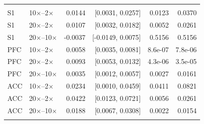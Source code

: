 \begin{longtable}{llrrrr}
\addlinespace
\multicolumn{6}{l}{\textbf{Evoked fraction}} \\
S1 & 10$\times$--2$\times$ & 0.0144 & [0.0031, 0.0257] & 0.0123 & 0.0370 \\
S1 & 20$\times$--2$\times$ & 0.0107 & [0.0032, 0.0182] & 0.0052 & 0.0261 \\
S1 & 20$\times$--10$\times$ & -0.0037 & [-0.0149, 0.0075] & 0.5156 & 0.5156 \\
PFC & 10$\times$--2$\times$ & 0.0058 & [0.0035, 0.0081] & 8.6e-07 & 7.8e-06 \\
PFC & 20$\times$--2$\times$ & 0.0093 & [0.0053, 0.0132] & 4.3e-06 & 3.5e-05 \\
PFC & 20$\times$--10$\times$ & 0.0035 & [0.0012, 0.0057] & 0.0027 & 0.0161 \\
ACC & 10$\times$--2$\times$ & 0.0234 & [0.0010, 0.0459] & 0.0411 & 0.0821 \\
ACC & 20$\times$--2$\times$ & 0.0422 & [0.0123, 0.0721] & 0.0056 & 0.0261 \\
ACC & 20$\times$--10$\times$ & 0.0188 & [0.0067, 0.0308] & 0.0022 & 0.0154 \\
\addlinespace
\bottomrule
\end{longtable}
